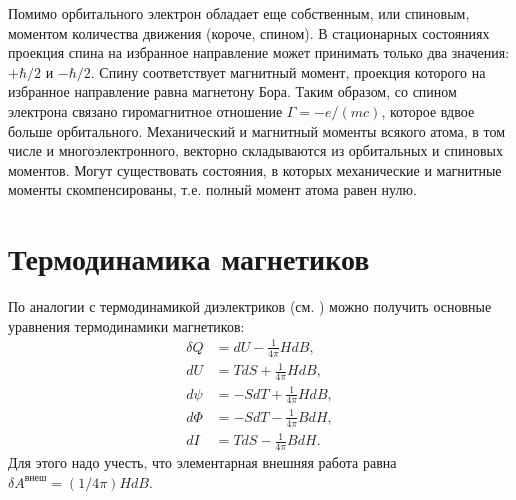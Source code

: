 \documentclass[12pt]{article}
\begin{document}
  Помимо орбитального электрон обладает еще собственным, или спиновым, моментом количества движения (короче, спином). В стационарных состояниях проекция спина на избранное направление может принимать только два значения: $+\hbar / 2$ и $-\hbar / 2$. Спину соответствует магнитный момент, проекция которого на избранное направление равна магнетону Бора. Таким образом, со спином электрона связано гиромагнитное отношение $\Gamma=-e /(m c)$, которое вдвое больше орбитального. Механический и магнитный моменты всякого атома, в том числе и многоэлектронного, векторно складываются из орбитальных и спиновых моментов. Могут существовать состояния, в которых механические и магнитные моменты скомпенсированы, т.е. полный момент атома равен нулю.

  \section{Термодинамика магнетиков}
  По аналогии с термодинамикой диэлектриков (см. \cite[\S31]{sivykhin3}) можно получить основные уравнения
  термодинамики магнетиков:
  \begin{align}
    \delta Q  &= dU - \frac{1}{4\pi}HdB,\\
    dU &= TdS + \frac{1}{4\pi}HdB,\\ \label{eq:term3}
    d\psi &= -SdT + \frac{1}{4\pi}HdB,\\ \label{eq:term4}
    d\Phi &= -SdT - \frac{1}{4\pi}BdH,\\
    dI &= TdS - \frac{1}{4\pi}BdH.
  \end{align}
  Для этого надо учесть, что элементарная внешняя работа равна $\delta A^{\text{внеш}} = (1/4\pi)HdB$.
\end{document}

